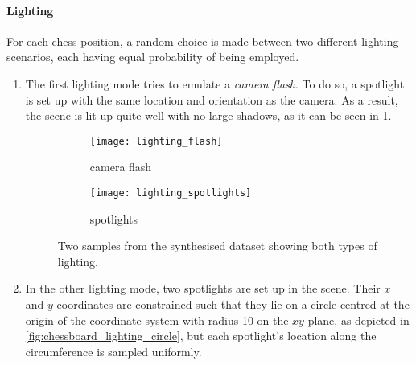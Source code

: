 \documentclass[../report.tex]{subfiles}
\begin{document}
\paragraph{Lighting}
For each chess position, a random choice is made between two different lighting scenarios, each having equal probability of being employed.
\begin{enumerate}
    \item The first lighting mode tries to emulate a \emph{camera flash}.
        To do so, a spotlight is set up with the same location and orientation as the camera. 
        As a result, the scene is lit up quite well with no large shadows, as it can be seen in \cref{fig:lighting_flash_example}.
        \begin{figure}
            \centering
            \begin{subfigure}[b]{0.47\textwidth}
                \centering
                \texttt{[image: lighting\_flash]}
                \caption{camera flash}
                \label{fig:lighting_flash_example}
            \end{subfigure}
            \hfill
            \begin{subfigure}[b]{0.47\textwidth}
                \centering
                \texttt{[image: lighting\_spotlights]}
                \caption{spotlights}
                \label{fig:lighting_spotlights_example}
            \end{subfigure}
            \caption{Two samples from the synthesised dataset showing both types of lighting.}
            \label{fig:lighting_examples}
        \end{figure}
    \item In the other lighting mode, two spotlights are set up in the scene. 
        Their $x$ and $y$ coordinates are constrained such that they lie on a circle centred at the origin of the coordinate system with radius 10 on the $xy$-plane, as depicted in \cref{fig:chessboard_lighting_circle}, but each spotlight's location along the circumference is sampled uniformly.
        \begin{figure}
            \centering
\end{figure}
\end{enumerate}
\end{document}
